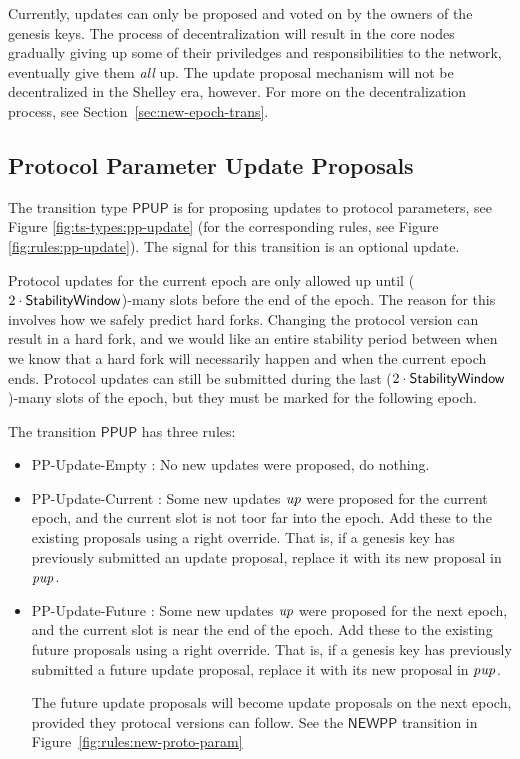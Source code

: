Currently, updates can only be proposed and voted on by the owners of the genesis keys.
The process of decentralization will result in the core nodes gradually giving up
some of their priviledges and responsibilities to the network,
eventually give them \textit{all} up.
The update proposal mechanism will not be decentralized in the Shelley era, however.
For more on the decentralization process, see Section~\ref{sec:new-epoch-trans}.

\subsection{Protocol Parameter Update Proposals}
\label{sec:pp-proposals}

The transition type $\mathsf{PPUP}$ is for proposing updates to protocol
parameters, see Figure \ref{fig:ts-types:pp-update} (for the corresponding rules,
see Figure \ref{fig:rules:pp-update}).
The signal for this transition is an optional update.

Protocol updates for the current epoch are only allowed up until
($2\cdot\mathsf{StabilityWindow}$)-many slots before the end of the epoch.
The reason for this involves how we safely predict hard forks.
Changing the protocol version can result in a hard fork, and we would like an
entire stability period between when we know that a hard fork will necessarily happen
and when the current epoch ends.
Protocol updates can still be submitted during the last
($2\cdot\mathsf{StabilityWindow}$)-many slots of the epoch, but they must
be marked for the following epoch.

The transition $\mathsf{PPUP}$ has three rules:
\begin{itemize}
  \item PP-Update-Empty : No new updates were proposed, do nothing.
  \item PP-Update-Current : Some new updates $\mathit{up}$ were proposed
    for the current epoch, and the current slot is not toor far into the epoch.
    Add these to the existing proposals using a right override. That is, if a genesis key
    has previously submitted an update proposal, replace it with its new
    proposal in $\mathit{pup}$.
  \item PP-Update-Future : Some new updates $\mathit{up}$ were proposed
    for the next epoch, and the current slot is near the end of the epoch.
    Add these to the existing future proposals using a right override. That is, if a genesis key
    has previously submitted a future update proposal, replace it with its new
    proposal in $\mathit{pup}$.

    The future update proposals will become update proposals on the next epoch,
    provided they protocal versions can follow.
    See the $\mathsf{NEWPP}$ transition in Figure~\ref{fig:rules:new-proto-param}

\end{itemize}

